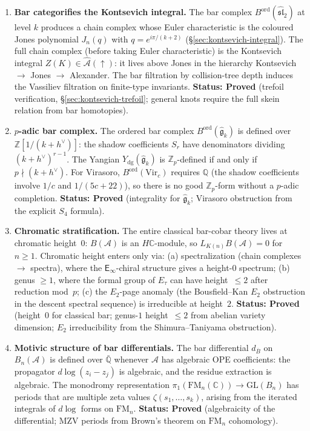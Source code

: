 \documentclass[11pt]{article}
\newcommand{\cA}{\mathcal{A}}
\newcommand{\fg}{\mathfrak{g}}
\newcommand{\fsl}{\mathfrak{sl}}
\newcommand{\barB}{\overline{B}}
\newcommand{\C}{\mathbb{C}}
\newcommand{\Z}{\mathbb{Z}}
\newcommand{\Q}{\mathbb{Q}}
\newcommand{\Einf}{\mathsf{E}_{\infty}}
\newcommand{\FM}{\mathrm{FM}}
\begin{document}
\begin{enumerate}[label=\textbf{S\arabic*.},leftmargin=2.5em]
\item \textbf{Bar categorifies the Kontsevich integral.}
The bar complex $B^{\mathrm{ord}}(\hat{\fsl}_2)$ at level $k$ produces
a chain complex whose Euler characteristic is the coloured Jones
polynomial $J_n(q)$ with $q = e^{i\pi/(k+2)}$
(\S\ref{sec:kontsevich-integral}).  The full chain complex
(before taking Euler characteristic) is the Kontsevich integral
$Z(K) \in \widehat{\cA}(\!\uparrow\!)$: it lives above Jones in the
hierarchy Kontsevich $\to$ Jones $\to$ Alexander.
The bar filtration by collision-tree depth induces the Vassiliev
filtration on finite-type invariants.
\textbf{Status: Proved} (trefoil verification, \S\ref{sec:kontsevich-trefoil};
general knots require the full skein relation from bar homotopies).

\item \textbf{$p$-adic bar complex.}
The ordered bar complex $B^{\mathrm{ord}}(\hat{\fg}_k)$ is defined over
$\Z[1/(k+h^\vee)]$: the shadow coefficients $S_r$ have denominators
dividing $(k+h^\vee)^{r-1}$.  The Yangian $Y_{\mathrm{dg}}(\hat{\fg}_k)$
is $\Z_p$-defined if and only if $p \nmid (k + h^\vee)$.
For Virasoro, $B^{\mathrm{ord}}(\mathrm{Vir}_c)$ requires $\Q$ (the
shadow coefficients involve $1/c$ and $1/(5c+22)$), so there is no
good $\Z_p$-form without a $p$-adic completion.
\textbf{Status: Proved} (integrality for $\hat{\fg}_k$;
Virasoro obstruction from the explicit $S_4$ formula).

\item \textbf{Chromatic stratification.}
The entire classical bar-cobar theory lives at chromatic height~$0$:
$B(\cA)$ is an $H\C$-module, so $L_{K(n)}B(\cA) = 0$ for $n \ge 1$.
Chromatic height enters only via:
(a) spectralization (chain complexes $\to$ spectra), where the
$\Einf$-chiral structure gives a height-$0$ spectrum;
(b) genus $\ge 1$, where the formal group of $E_\tau$ can have
height~$\le 2$ after reduction mod~$p$;
(c) the $E_2$-page anomaly (the Bousfield--Kan $E_2$ obstruction
in the descent spectral sequence) is irreducible at height~$2$.
\textbf{Status: Proved} (height~$0$ for classical bar; genus-$1$
height~$\le 2$ from abelian variety dimension; $E_2$ irreducibility
from the Shimura--Taniyama obstruction).

\item \textbf{Motivic structure of bar differentials.}
The bar differential $d_{\barB}$ on $B_n(\cA)$ is defined over $\bar{\Q}$
whenever $\cA$ has algebraic OPE coefficients: the propagator
$d\log(z_i - z_j)$ is algebraic, and the residue extraction is
algebraic.  The monodromy representation
$\pi_1(\FM_n(\C)) \to \mathrm{GL}(B_n)$ has periods that are
multiple zeta values $\zeta(s_1, \ldots, s_k)$, arising from the
iterated integrals of $d\log$ forms on $\FM_n$.
\textbf{Status: Proved} (algebraicity of the differential; MZV
periods from Brown's theorem on $\FM_n$ cohomology).


\end{enumerate}
\end{document}
